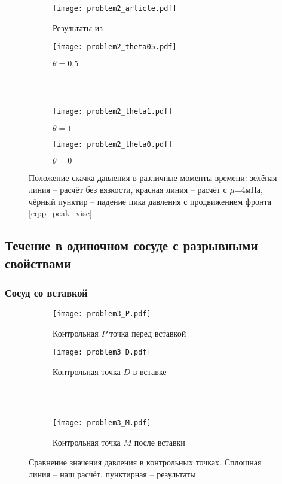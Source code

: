 \begin{figure}[h!]
\begin{subfigure}{0.5\linewidth}\centering
\texttt{[image: problem2\_article.pdf]}
\caption{Результаты из~\cite{boileau:2015}}\label{fig:prob2_a}
\end{subfigure}%
\begin{subfigure}{0.5\linewidth}\centering
\texttt{[image: problem2\_theta05.pdf]}
\caption{$\theta=0.5$}\label{fig:prob2_b}
\end{subfigure} \\
\hfill \\
\begin{subfigure}{0.5\linewidth}\centering
\texttt{[image: problem2\_theta1.pdf]}
\caption{$\theta=1$}\label{fig:prob2_c}
\end{subfigure}%
\begin{subfigure}{0.5\linewidth}\centering
\texttt{[image: problem2\_theta0.pdf]}
\caption{$\theta=0$}\label{fig:prob2_d}
\end{subfigure}%
\caption{Положение скачка давления в различные моменты времени: зелёная линия -- расчёт без вязкости, красная линия -- расчёт с $\mu$=4мПа,
чёрный пунктир -- падение пика давления с продвижением фронта \cref{eq:p_peak_visc}}\label{fig:prob2}
\end{figure}


\subsection{Течение в одиночном сосуде с разрывными свойствами}
\subsubsection{Сосуд со вставкой}

\begin{figure}[h!]
\begin{subfigure}{0.5\linewidth}\centering
\texttt{[image: problem3\_P.pdf]}
\caption{Контрольная $P$ точка перед вставкой}\label{fig:prob3_a}
\end{subfigure}%
\begin{subfigure}{0.5\linewidth}\centering
\texttt{[image: problem3\_D.pdf]}
\caption{Контрольная точка $D$ в вставке}\label{fig:prob3_b}
\end{subfigure} \\
\hfill \\
\begin{subfigure}{0.5\linewidth}\centering
\texttt{[image: problem3\_M.pdf]}
\caption{Контрольная точка $M$ после вставки}\label{fig:prob3_c}
\end{subfigure}%
\caption{Сравнение значения давления в контрольных точках. Сплошная линия -- наш расчёт, пунктирная -- результаты~\cite{Sherwin2003}}\label{fig:prob3}
\end{figure}

